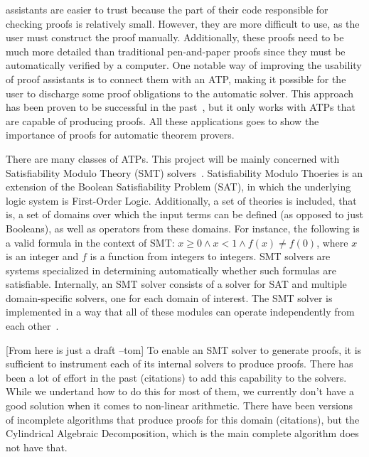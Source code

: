 \documentclass[a4paper, 12pt]{article}
\newcommand{\yell}[1]{{\color{blue} [#1]}}
\newcommand{\tom}[1]{\yell{#1 --tom}}
\begin{document}
assistants are easier to trust because the part of their code responsible for checking proofs is
relatively small. However, they are more difficult to use, as the user must construct the proof
manually. Additionally, these proofs need to be much more detailed than traditional pen-and-paper proofs
since they must be automatically verified by a computer.
%
One notable way of improving the usability of proof assistants is to connect them with an ATP,
making it possible for the user to discharge some proof obligations to the automatic solver.
This approach has been proven to be successful in the past~\cite{coq2, reconstruct}, but it
only works with ATPs that are capable of producing proofs.
%
All these applications goes to show the importance of proofs for automatic theorem provers.

There are many classes of ATPs. This project will be mainly concerned with Satisfiability Modulo Theory (SMT)
solvers~\cite{smtbook}. Satisfiability Modulo Thoeries is an extension of the Boolean Satisfiability Problem (SAT), in
which the underlying logic system is First-Order Logic. Additionally, a set of theories is included, that is,
a set of domains over which the input terms can be defined (as opposed to just Booleans), as well as operators
from these domains. For instance, the following is a valid formula in the context of SMT: $x \ge 0 \wedge x < 1
\wedge f(x) \neq f(0)$, where $x$ is an integer and $f$ is a function from integers to integers. SMT solvers are
systems specialized in determining automatically whether such formulas are satisfiable. Internally, an SMT solver
consists of a solver for SAT and multiple domain-specific solvers, one for each domain of interest. The SMT solver
is implemented in a way that all of these modules can operate independently from each other~\cite{cdcl_t}.


\tom{From here is just a draft}
To enable an SMT solver to generate proofs, it is sufficient to instrument each of its internal solvers to produce proofs.
There has been a lot of effort in the past (citations) to add this capability to the solvers. While we undertand
how to do this for most of them, we currently don't have a good solution when it comes to non-linear arithmetic.
There have been versions of incomplete algorithms that produce proofs for this domain (citations), but the Cylindrical Algebraic
Decomposition, which is the main complete algorithm does not have that.
\end{document}
